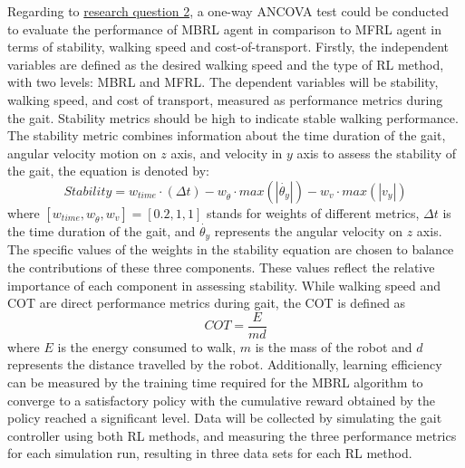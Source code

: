 Regarding to \hyperref[rq2]{research question 2}, a one-way \ac{ANCOVA} test could be conducted to evaluate the performance of \ac{MBRL} agent in comparison to \ac{MFRL} agent in terms of stability, walking speed and cost-of-transport. Firstly, the independent variables are defined as the desired walking speed and the type of RL method, with two levels: MBRL and MFRL. The dependent variables will be stability, walking speed, and cost of transport, measured as performance metrics during the gait. Stability metrics should be high to indicate stable walking performance. The stability metric combines information about the time duration of the gait, angular velocity motion on $z$ axis, and velocity in $y$ axis to assess the stability of the gait, the equation is denoted by:
\begin{equation}
Stability = w_{time} \cdot (\Delta t) - w_{\Dot{\theta}} \cdot max(|\Dot{\theta_y}|) - w_{v} \cdot max(|v_y|)
\label{eq:stability}
\end{equation}
where $[w_{time},w_{\Dot{\theta}},w_{v}] = [0.2,1,1]$ stands for weights of different metrics, $\Delta t$ is the time duration of the gait, and $\Dot{\theta_y}$ represents the angular velocity on $z$ axis. The specific values of the weights in the stability equation are chosen to balance the contributions of these three components. These values reflect the relative importance of each component in assessing stability. While walking speed and \ac{COT} are direct performance metrics during gait, the COT is defined as 
\begin{equation}
    COT = \frac{E}{md}
    \label{eq:COT}
\end{equation}
where $E$ is the energy consumed to walk, $m$ is the mass of the robot and $d$ represents the distance travelled by the robot. Additionally, learning efficiency can be measured by the training time required for the MBRL algorithm to converge to a satisfactory policy with the cumulative reward obtained by the policy reached a significant level. Data will be collected by simulating the gait controller using both RL methods, and measuring the three performance metrics for each simulation run, resulting in three data sets for each RL method. 
